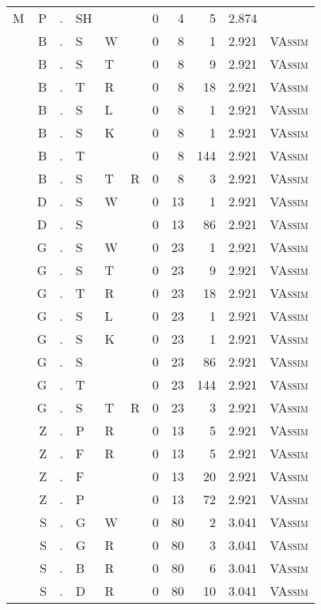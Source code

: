 \begin{longtable}{r@{ } r@{ } c@{ } l@{ } l@{ } l@{ } r r r r l }
M & P & . & SH &   &   & 0 & 4 & 5 & 2.874 &  \\
  & B & . & S & W &   & 0 & 8 & 1 & 2.921 & \textsc{VAssim} \\
  & B & . & S & T &   & 0 & 8 & 9 & 2.921 & \textsc{VAssim} \\
  & B & . & T & R &   & 0 & 8 & 18 & 2.921 & \textsc{VAssim} \\
  & B & . & S & L &   & 0 & 8 & 1 & 2.921 & \textsc{VAssim} \\
  & B & . & S & K &   & 0 & 8 & 1 & 2.921 & \textsc{VAssim} \\
  & B & . & T &   &   & 0 & 8 & 144 & 2.921 & \textsc{VAssim} \\
  & B & . & S & T & R & 0 & 8 & 3 & 2.921 & \textsc{VAssim} \\
  & D & . & S & W &   & 0 & 13 & 1 & 2.921 & \textsc{VAssim} \\
  & D & . & S &   &   & 0 & 13 & 86 & 2.921 & \textsc{VAssim} \\
  & G & . & S & W &   & 0 & 23 & 1 & 2.921 & \textsc{VAssim} \\
  & G & . & S & T &   & 0 & 23 & 9 & 2.921 & \textsc{VAssim} \\
  & G & . & T & R &   & 0 & 23 & 18 & 2.921 & \textsc{VAssim} \\
  & G & . & S & L &   & 0 & 23 & 1 & 2.921 & \textsc{VAssim} \\
  & G & . & S & K &   & 0 & 23 & 1 & 2.921 & \textsc{VAssim} \\
  & G & . & S &   &   & 0 & 23 & 86 & 2.921 & \textsc{VAssim} \\
  & G & . & T &   &   & 0 & 23 & 144 & 2.921 & \textsc{VAssim} \\
  & G & . & S & T & R & 0 & 23 & 3 & 2.921 & \textsc{VAssim} \\
  & Z & . & P & R &   & 0 & 13 & 5 & 2.921 & \textsc{VAssim} \\
  & Z & . & F & R &   & 0 & 13 & 5 & 2.921 & \textsc{VAssim} \\
  & Z & . & F &   &   & 0 & 13 & 20 & 2.921 & \textsc{VAssim} \\
  & Z & . & P &   &   & 0 & 13 & 72 & 2.921 & \textsc{VAssim} \\
  & S & . & G & W &   & 0 & 80 & 2 & 3.041 & \textsc{VAssim} \\
  & S & . & G & R &   & 0 & 80 & 3 & 3.041 & \textsc{VAssim} \\
  & S & . & B & R &   & 0 & 80 & 6 & 3.041 & \textsc{VAssim} \\
  & S & . & D & R &   & 0 & 80 & 10 & 3.041 & \textsc{VAssim} \\

\end{longtable}
